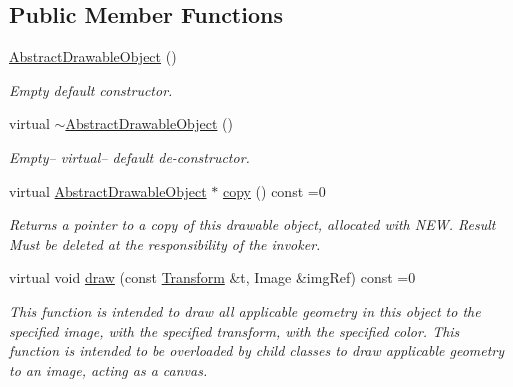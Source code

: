 \subsection*{Public Member Functions}
\begin{DoxyCompactItemize}
\item 
\mbox{\label{classcturtle_1_1AbstractDrawableObject_ab341cf2b8c9bf6cafd11195e21b8ed21}} 
\hyperlink{classcturtle_1_1AbstractDrawableObject_ab341cf2b8c9bf6cafd11195e21b8ed21}{Abstract\+Drawable\+Object} ()
\begin{DoxyCompactList}\small\item\em Empty default constructor. \end{DoxyCompactList}\item 
\mbox{\label{classcturtle_1_1AbstractDrawableObject_ae2f6b7c2e982b772779ec2957003b028}} 
virtual \hyperlink{classcturtle_1_1AbstractDrawableObject_ae2f6b7c2e982b772779ec2957003b028}{$\sim$\+Abstract\+Drawable\+Object} ()
\begin{DoxyCompactList}\small\item\em Empty-- virtual-- default de-\/constructor. \end{DoxyCompactList}\item 
\mbox{\label{classcturtle_1_1AbstractDrawableObject_acff3437e999d281773b66e6cf2115372}} 
virtual \hyperlink{classcturtle_1_1AbstractDrawableObject}{Abstract\+Drawable\+Object} $\ast$ \hyperlink{classcturtle_1_1AbstractDrawableObject_acff3437e999d281773b66e6cf2115372}{copy} () const =0
\begin{DoxyCompactList}\small\item\em Returns a pointer to a copy of this drawable object, allocated with N\+EW. Result Must be deleted at the responsibility of the invoker. \end{DoxyCompactList}\item 
virtual void \hyperlink{classcturtle_1_1AbstractDrawableObject_a7b1ad1e9743d343e0fe577de3978bdad}{draw} (const \hyperlink{classcturtle_1_1Transform}{Transform} \&t, Image \&img\+Ref) const =0
\begin{DoxyCompactList}\small\item\em This function is intended to draw all applicable geometry in this object to the specified image, with the specified transform, with the specified color. This function is intended to be overloaded by child classes to draw applicable geometry to an image, acting as a canvas. \end{DoxyCompactList}\end{DoxyCompactItemize}
